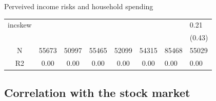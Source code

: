 \documentclass{beamer}
\begin{document}
\begin{frame}{Perveived income risks and household spending}
\begin{table}
{\begin{tabular}{ccccccll}
		incskew   &            &             &              &               &                &                 &             0.21 \\
		&            &             &              &               &                &                 &           (0.43) \\
		\hline 
		N         &      55673 &       50997 &        55465 &         52099 &          54315 &           85468 &            55029 \\
		R2        &       0.00 &        0.00 &         0.00 &          0.00 &           0.00 &            0.00 &             0.00 \\
		\hline 
	\end{tabular}
		}
	\end{table}
\end{frame}


\subsection{Correlation with the stock market}
\end{document}
